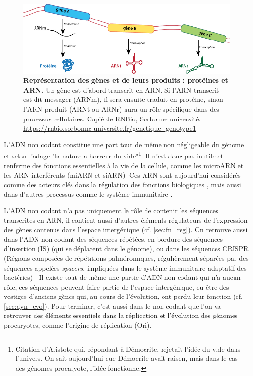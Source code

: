 \begin{figure}[htbp]
    \centering
    \includegraphics[width=\linewidth]{images/gene2prot.jpg}
    \caption[Représentation des gènes et de leurs produits]{\textbf{Représentation des gènes et de leurs produits : protéines et ARN.} Un gène est d'abord transcrit en ARN. Si l'ARN transcrit est dit messager (ARNm), il sera ensuite traduit en protéine, sinon l'ARN produit (ARNt ou ARNr) aura un rôle spécifique dans des processus cellulaires. Copié de RNBio, Sorbonne université. \url{https://rnbio.sorbonne-universite.fr/genetique_genotype1}}
    \label{fig:gene2prod}
\end{figure}

L'ADN non codant constitue une part tout de même non négligeable du génome et selon l'adage "la nature a horreur du vide"\footnote{Citation d'Aristote qui, répondant à Démocrite, rejetait l’idée du vide dans l’univers. On sait aujourd'hui que Démocrite avait raison, mais dans le cas des génomes procaryote, l'idée fonctionne.}. Il n'est donc pas inutile et renferme des fonctions essentielles à la vie de la cellule, comme les microARN et les ARN interférents (miARN et siARN). Ces ARN sont aujourd'hui considérés comme des acteurs clés dans la régulation des fonctions biologiques \cite{backofen_bioinformatics_2014,watkins_regulatory_2019}, mais aussi dans d'autres processus comme le système immunitaire \cite{bobadilla_ugarte_argonaute_2023}.

L'ADN non codant n'a pas uniquement le rôle de contenir les séquences transcrites en ARN, il contient aussi d'autres éléments régulateurs de l'expression des gènes contenus dans l'espace intergénique (cf. \autoref{sec:fn_reg}). On retrouve aussi dans l'ADN non codant des séquences répétées, en bordure des séquences d'insertion (IS) (qui se déplacent dans le génome), ou dans les séquences CRISPR (Régions composées de répétitions palindromiques, régulièrement séparées par des séquences appelées \textit{spacers}, impliquées dans le système immunitaire adaptatif des bactéries) \cite{jansen_identification_2002,bolotin_clustered_2005}. Il existe tout de même une partie d'ADN non codant qui n'a aucun rôle, ces séquences peuvent faire partie de l'espace intergénique, ou être des vestiges d'anciens gènes qui, au cours de l'évolution, ont perdu leur fonction (cf. \autoref{sec:dyn_evo}). Pour terminer, c'est aussi dans le non-codant que l'on va retrouver des éléments essentiels dans la réplication et l'évolution des génomes procaryotes, comme l'origine de réplication (Ori).

